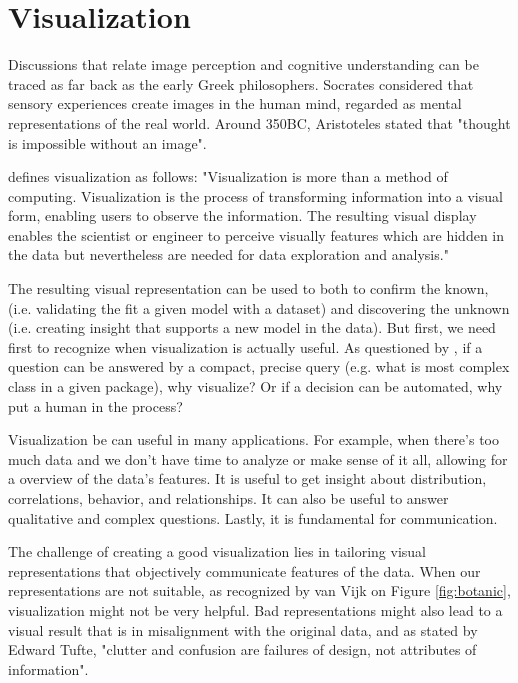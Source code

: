 \chapter{Visualization} \label{sec:visualization}

Discussions that relate image perception and cognitive understanding can be traced as far back as the early Greek philosophers. Socrates considered that sensory experiences create images in the human mind, regarded as mental representations of the real world. Around 350BC, Aristoteles stated that "thought is impossible without an image".

\citet{ref:gershon94} defines visualization as follows: "Visualization is more than a method of computing. Visualization is the process of transforming information into a visual form, enabling users to observe the information. The resulting visual display enables the scientist or engineer to perceive visually features which are hidden in the data but nevertheless are needed for data exploration and analysis."

The resulting visual representation can be used to both to confirm the known, (i.e. validating the fit a given model with a dataset) and discovering the unknown (i.e. creating insight that supports a new model in the data). But first, we need first to recognize when visualization is actually useful. As questioned by \citet{ref:scivis}, if a question can be answered by a compact, precise query (e.g. what is most complex class in a given package), why visualize? Or if a decision can be automated, why put a human in the process?

Visualization be can useful in many applications. For example, when there's too much data and we don't have time to analyze or make sense of it all, allowing for a overview of the data's features. It is useful to get insight about distribution, correlations, behavior, and relationships. It can also be useful to answer qualitative and complex questions. Lastly, it is fundamental for communication.

The challenge of creating a good visualization lies in tailoring visual representations that objectively communicate features of the data. When our representations are not suitable, as recognized by van Vijk on Figure \ref{fig:botanic}, visualization might not be very helpful. Bad representations might also lead to a visual result that is in misalignment with the original data, and as stated by Edward Tufte, "clutter and confusion are failures of design, not attributes of information".

